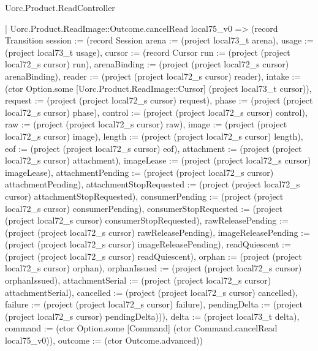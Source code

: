 \begin{lexlean}{Uorc.Product.ReadController}
\begin{semanticmodule}
{    | Uorc.Product.ReadImage::Outcome.cancelRead local75_v0 => (record Transition {session := (record Session {arena := (project local73_t arena), usage := (project local73_t usage), cursor := (record Cursor {run := (project (project local72_s cursor) run), arenaBinding := (project (project local72_s cursor) arenaBinding), reader := (project (project local72_s cursor) reader), intake := (ctor Option.some [Uorc.Product.ReadImage::Cursor] (project local73_t cursor)), request := (project (project local72_s cursor) request), phase := (project (project local72_s cursor) phase), control := (project (project local72_s cursor) control), raw := (project (project local72_s cursor) raw), image := (project (project local72_s cursor) image), length := (project (project local72_s cursor) length), eof := (project (project local72_s cursor) eof), attachment := (project (project local72_s cursor) attachment), imageLease := (project (project local72_s cursor) imageLease), attachmentPending := (project (project local72_s cursor) attachmentPending), attachmentStopRequested := (project (project local72_s cursor) attachmentStopRequested), consumerPending := (project (project local72_s cursor) consumerPending), consumerStopRequested := (project (project local72_s cursor) consumerStopRequested), rawReleasePending := (project (project local72_s cursor) rawReleasePending), imageReleasePending := (project (project local72_s cursor) imageReleasePending), readQuiescent := (project (project local72_s cursor) readQuiescent), orphan := (project (project local72_s cursor) orphan), orphanIssued := (project (project local72_s cursor) orphanIssued), attachmentSerial := (project (project local72_s cursor) attachmentSerial), cancelled := (project (project local72_s cursor) cancelled), failure := (project (project local72_s cursor) failure), pendingDelta := (project (project local72_s cursor) pendingDelta)})}), delta := (project local73_t delta), command := (ctor Option.some [Command] (ctor Command.cancelRead local75_v0)), outcome := (ctor Outcome.advanced)})
}
\end{semanticmodule}
\end{lexlean}

